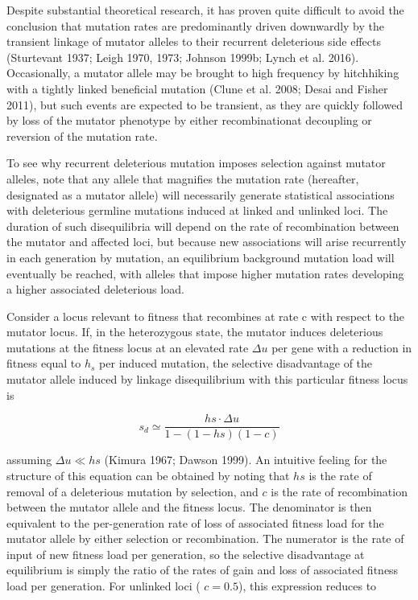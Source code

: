 \documentclass{article}
\begin{document}
Despite substantial theoretical research, it has proven quite difficult to avoid the conclusion that mutation rates are predominantly driven downwardly by the transient linkage of mutator alleles to their recurrent deleterious side effects (Sturtevant 1937; Leigh 1970, 1973; Johnson 1999b; Lynch et al. 2016). Occasionally, a mutator allele may be brought to high frequency by hitchhiking with a tightly linked beneficial mutation (Clune et al. 2008; Desai and Fisher 2011), but such events are expected to be transient, as they are quickly followed by loss of the mutator phenotype by either recombinationat decoupling or reversion of the mutation rate.

To see why recurrent deleterious mutation imposes selection against mutator alleles, note that any allele that magnifies the mutation rate (hereafter, designated as a mutator allele) will necessarily generate statistical associations with deleterious germline mutations induced at linked and unlinked loci. The duration of such disequilibria will depend on the rate of recombination between the mutator and affected loci, but because new associations will arise recurrently in each generation by mutation, an equilibrium background mutation load will eventually be reached, with alleles that impose higher mutation rates developing a higher associated deleterious load.

Consider a locus relevant to fitness that recombines at rate c with respect to the mutator locus. If, in the heterozygous state, the mutator induces deleterious mutations at the fitness locus at an elevated rate  $ \Delta u $ per gene with a reduction in fitness equal to  $ h_s $ per induced mutation, the selective disadvantage of the mutator allele induced by linkage disequilibrium with this particular fitness locus is

\begin{equation}
s_{d}\simeq\frac{h s\cdot\Delta u}{1-(1-h s)(1-c)}
\tag{4.23a}
\label{eq:4_23a}
\end{equation}

assuming  $ \Delta u \ll h s $ (Kimura 1967; Dawson 1999). An intuitive feeling for the structure of this equation can be obtained by noting that  $ h s $ is the rate of removal of a deleterious mutation by selection, and  $ c $ is the rate of recombination between the mutator allele and the fitness locus. The denominator is then equivalent to the per-generation rate of loss of associated fitness load for the mutator allele by either selection or recombination. The numerator is the rate of input of new fitness load per generation, so the selective disadvantage at equilibrium is simply the ratio of the rates of gain and loss of associated fitness load per generation. For unlinked loci ( $ c = 0.5 $), this expression reduces to
\end{document}
